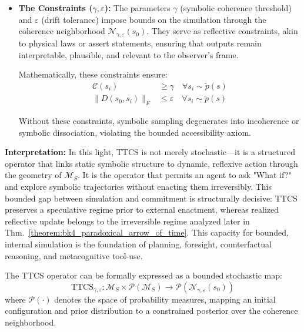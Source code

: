 \begin{scholium}
\begin{itemize}
  This execution generates potential future configurations $\{s_i\}_{i=1}^N$ consistent with the logic and constraints embedded in the internal model. This execution is metaphysically non-committal: a speculative traversal of symbolic possibility space constrained by geometric and semantic bounds.

  \item \textbf{The Constraints ($\gamma, \varepsilon$):}  
  The parameters $\gamma$ (symbolic coherence threshold) and $\varepsilon$ (drift tolerance) impose bounds on the simulation through the coherence neighborhood $\mathcal{N}_{\gamma,\varepsilon}(s_0)$. They serve as reflective constraints, akin to physical laws or assert statements, ensuring that outputs remain interpretable, plausible, and relevant to the observer's frame. 

  Mathematically, these constraints ensure:
  \begin{align}
  \mathcal{C}(s_i) &\geq \gamma \quad \forall s_i \sim \tilde{p}(s) \\
  \|D(s_0, s_i)\|_F &\leq \varepsilon \quad \forall s_i \sim \tilde{p}(s)
  \end{align}

  Without these constraints, symbolic sampling degenerates into incoherence or symbolic dissociation, violating the bounded accessibility axiom.
\end{itemize}

\textbf{Interpretation:}  
In this light, TTCS is not merely stochastic---it is a structured operator that links static symbolic structure to dynamic, reflexive action through the geometry of $\mathcal{M}_S$. It is the operator that permits an agent to ask "What if?" and explore symbolic trajectories without enacting them irreversibly. This bounded gap between simulation and commitment is structurally decisive: TTCS preserves a speculative regime prior to external enactment, whereas realized reflective update belongs to the irreversible regime analyzed later in Thm.~\ref{theorem:bk4_paradoxical_arrow_of_time}. This capacity for bounded, internal simulation is the foundation of planning, foresight, counterfactual reasoning, and metacognitive tool-use.

The TTCS operator can be formally expressed as a bounded stochastic map:
\[
\text{TTCS}_{\gamma,\varepsilon}: \mathcal{M}_S \times \mathcal{P}(\mathcal{M}_S) \to \mathcal{P}(\mathcal{N}_{\gamma,\varepsilon}(s_0))
\]
where $\mathcal{P}(\cdot)$ denotes the space of probability measures, mapping an initial configuration and prior distribution to a constrained posterior over the coherence neighborhood.


\end{scholium}
